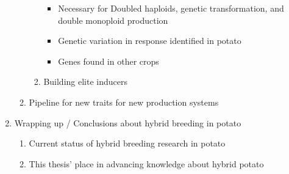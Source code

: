 \documentclass[
]{article}
\providecommand{\tightlist}{%
  \setlength{\itemsep}{0pt}\setlength{\parskip}{0pt}}\usepackage{longtable,booktabs,array}
\begin{document}
\begin{enumerate}
\begin{enumerate}
\begin{enumerate}
      \begin{itemize}
      \tightlist
      \item
        Necessary for Doubled haploids, genetic transformation, and
        double monoploid production
      \item
        Genetic variation in response identified in potato
      \item
        Genes found in other crops \autocite{Koornneef1993}
      \end{itemize}
    \item
      Building elite inducers \autocite{Delzer2024}
    \end{enumerate}
  \item
    Pipeline for new traits for new production systems
  \end{enumerate}
\item
  Wrapping up / Conclusions about hybrid breeding in potato

  \begin{enumerate}
  \def\labelenumii{\roman{enumii})}
  \tightlist
  \item
    Current status of hybrid breeding research in potato
  \item
    This thesis' place in advancing knowledge about hybrid potato
  \end{enumerate}
\end{enumerate}


\printbibliography
\end{document}
